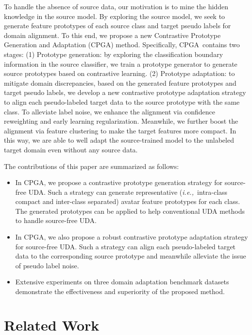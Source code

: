 \documentclass{article}
\def\ie{\emph{i.e.,~}}
\def\ournet{CPGA}
\begin{document}
To handle the absence of source data, our motivation is to mine the hidden knowledge in the source model. By exploring the source model, we seek to generate feature prototypes of each source class and target pseudo labels for domain alignment.
To this end, we propose a new Contrastive Prototype Generation and Adaptation (\ournet) method. Specifically, \ournet~contains two stages:
(1) Prototype generation: by exploring the classification boundary information in the source classifier, we train a prototype generator to generate source prototypes based on contrastive learning.
(2) Prototype adaptation: to mitigate domain discrepancies, based on the generated feature prototypes and target pseudo labels, we develop a new contrastive prototype adaptation strategy to align each pseudo-labeled target data to the source prototype with the same class. To alleviate label noise, we enhance the alignment via confidence reweighting and 
early learning regularization.
Meanwhile, we further boost the alignment via feature clustering to make the target features more compact.  
In this way, we are able to well adapt the source-trained model to the unlabeled target domain even without any source data.


The contributions of this paper are summarized as follows:
\begin{itemize}
    \item In \ournet, we propose a contrastive prototype generation strategy for source-free UDA. Such a strategy can generate representative (\ie intra-class compact and inter-class separated) avatar feature prototypes for each class. The generated prototypes can be applied to help conventional UDA methods to handle source-free UDA.
    \item In \ournet, we also propose a robust contrastive prototype adaptation strategy for source-free UDA. Such a strategy can align each pseudo-labeled target data to the corresponding source prototype and meanwhile alleviate the issue of pseudo label noise.
    \item Extensive experiments on three domain adaptation benchmark datasets demonstrate the effectiveness and superiority of the proposed method.
\end{itemize}





\section{Related Work}
\end{document}
